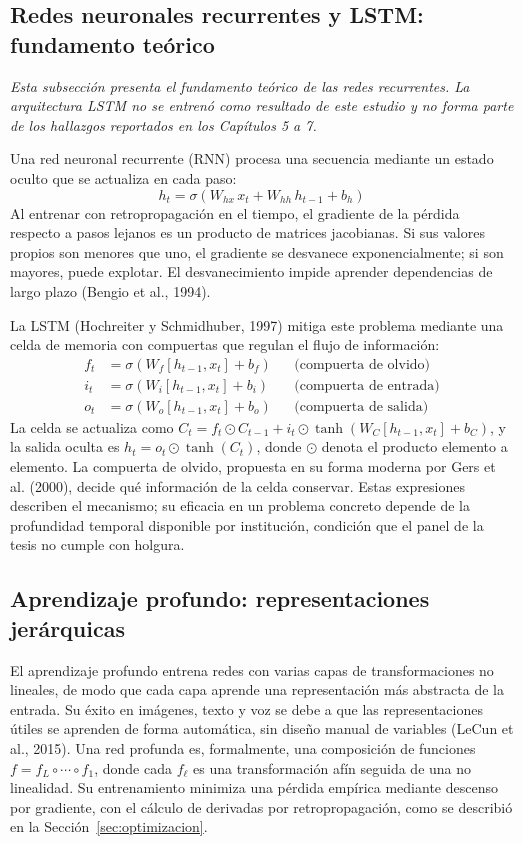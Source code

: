 \subsection{Redes neuronales recurrentes y LSTM: fundamento teórico}
\textit{Esta subsección presenta el fundamento teórico de las redes recurrentes. La arquitectura LSTM no se entrenó como resultado de este estudio y no forma parte de los hallazgos reportados en los Capítulos 5 a 7.}

Una red neuronal recurrente (RNN) procesa una secuencia mediante un estado oculto que se actualiza en cada paso:
\begin{equation}
h_t = \sigma(W_{hx}\, x_t + W_{hh}\, h_{t-1} + b_h)
\label{eq:rnn}
\end{equation}
Al entrenar con retropropagación en el tiempo, el gradiente de la pérdida respecto a pasos lejanos es un producto de matrices jacobianas. Si sus valores propios son menores que uno, el gradiente se desvanece exponencialmente; si son mayores, puede explotar. El desvanecimiento impide aprender dependencias de largo plazo (Bengio et al., 1994).

La LSTM (Hochreiter y Schmidhuber, 1997) mitiga este problema mediante una celda de memoria con compuertas que regulan el flujo de información:
\begin{align}
f_t &= \sigma(W_f[h_{t-1},x_t]+b_f) && \text{(compuerta de olvido)} \label{eq:lstm_f}\\
i_t &= \sigma(W_i[h_{t-1},x_t]+b_i) && \text{(compuerta de entrada)} \label{eq:lstm_i}\\
o_t &= \sigma(W_o[h_{t-1},x_t]+b_o) && \text{(compuerta de salida)} \label{eq:lstm_o}
\end{align}
La celda se actualiza como $C_t = f_t \odot C_{t-1} + i_t \odot \tanh(W_C[h_{t-1},x_t]+b_C)$, y la salida oculta es $h_t = o_t \odot \tanh(C_t)$, donde $\odot$ denota el producto elemento a elemento. La compuerta de olvido, propuesta en su forma moderna por Gers et al. (2000), decide qué información de la celda conservar. Estas expresiones describen el mecanismo; su eficacia en un problema concreto depende de la profundidad temporal disponible por institución, condición que el panel de la tesis no cumple con holgura.

\subsection{Aprendizaje profundo: representaciones jerárquicas}
El aprendizaje profundo entrena redes con varias capas de transformaciones no lineales, de modo que cada capa aprende una representación más abstracta de la entrada. Su éxito en imágenes, texto y voz se debe a que las representaciones útiles se aprenden de forma automática, sin diseño manual de variables (LeCun et al., 2015). Una red profunda es, formalmente, una composición de funciones $f=f_L\circ\cdots\circ f_1$, donde cada $f_\ell$ es una transformación afín seguida de una no linealidad. Su entrenamiento minimiza una pérdida empírica mediante descenso por gradiente, con el cálculo de derivadas por retropropagación, como se describió en la Sección~\ref{sec:optimizacion}.

